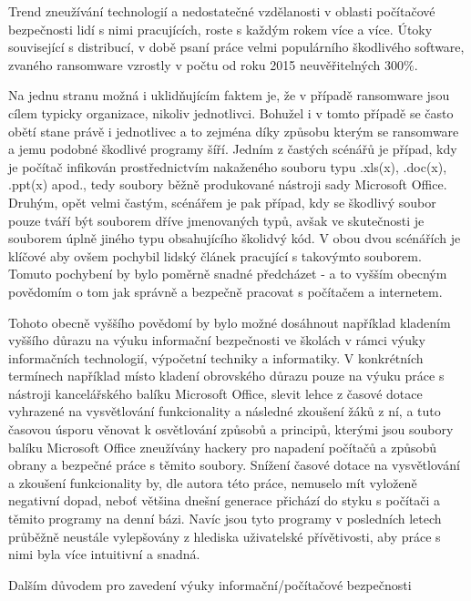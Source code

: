 \documentclass[a4paper, 11pt]{article}
\begin{document}
Trend zneužívání technologií a nedostatečné vzdělanosti v oblasti počítačové bezpečnosti lidí s nimi pracujících, roste s každým rokem více a více. Útoky související s distribucí, v době psaní práce velmi populárního škodlivého software, zvaného ransomware vzrostly v počtu od roku 2015 neuvěřitelných 300$\%$.

Na jednu stranu možná i uklidňujícím faktem je, že v případě ransomware jsou cílem typicky organizace, nikoliv jednotlivci. Bohužel i v tomto případě se často obětí stane právě i jednotlivec a to zejména díky způsobu kterým se ransomware a jemu podobné škodlivé programy šíří. Jedním z častých scénářů je případ, kdy je počítač infikován prostřednictvím nakaženého souboru typu .xls(x), .doc(x), .ppt(x) apod., tedy soubory běžně produkované nástroji sady Microsoft Office. Druhým, opět velmi častým, scénářem je pak případ, kdy se škodlivý soubor pouze tváří být souborem dříve jmenovaných typů, avšak ve skutečnosti je souborem úplně jiného typu obsahujícího školidvý kód. V obou dvou scénářích je klíčové aby ovšem pochybil lidský článek pracující s takovýmto souborem. Tomuto pochybení by bylo poměrně snadné předcházet - a to vyšším obecným povědomím o tom jak správně a bezpečně pracovat s počítačem a internetem. 

Tohoto obecně vyššího povědomí by bylo možné dosáhnout například kladením vyššího důrazu na výuku informační bezpečnosti ve školách v rámci výuky informačních technologií, výpočetní techniky a informatiky. V konkrétních termínech například místo kladení obrovského důrazu pouze na výuku práce s nástroji kancelářského balíku Microsoft Office, slevit lehce z časové dotace vyhrazené na vysvětlování funkcionality a následné zkoušení žáků z ní, a tuto časovou úsporu věnovat k osvětlování způsobů a principů, kterými jsou soubory balíku Microsoft Office zneužívány hackery pro napadení počítačů a způsobů obrany a bezpečné práce s těmito soubory. Snížení časové dotace na vysvětlování a zkoušení funkcionality by, dle autora této práce, nemuselo mít vyloženě negativní dopad, neboť většina dnešní generace přichází do styku s počítači a těmito programy na denní bázi. Navíc jsou tyto programy v posledních letech průběžně neustále vylepšovány z hlediska uživatelské přívětivosti, aby práce s nimi byla více intuitivní a snadná. 

Dalším důvodem pro zavedení výuky informační/počítačové bezpečnosti  
\end{document}
